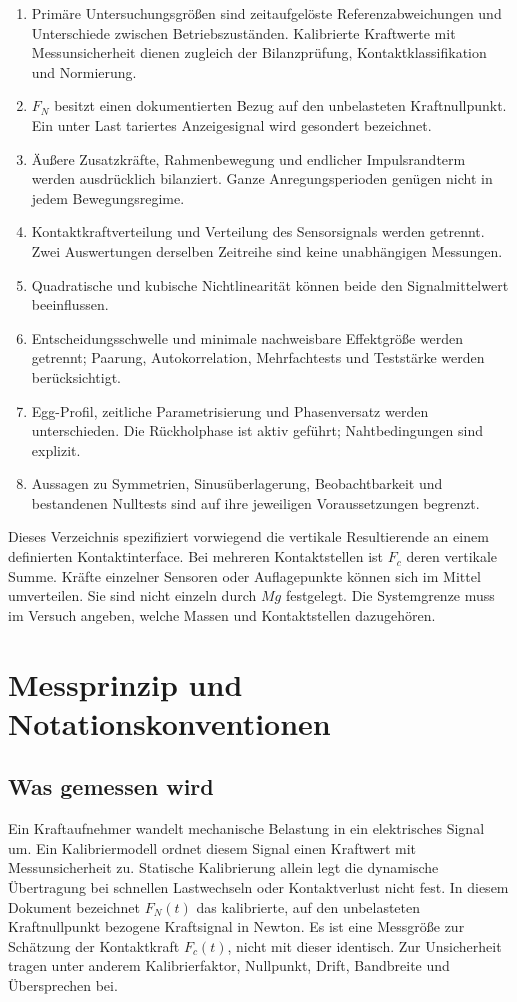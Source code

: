 \documentclass[11pt,a4paper]{article}
\begin{document}
\begin{enumerate}
\item Primäre Untersuchungsgrößen sind zeitaufgelöste Referenzabweichungen und Unterschiede zwischen Betriebszuständen. Kalibrierte Kraftwerte mit Messunsicherheit dienen zugleich der Bilanzprüfung, Kontaktklassifikation und Normierung.
\item $F_N$ besitzt einen dokumentierten Bezug auf den unbelasteten Kraftnullpunkt. Ein unter Last tariertes Anzeigesignal wird gesondert bezeichnet.
\item Äußere Zusatzkräfte, Rahmenbewegung und endlicher Impulsrandterm werden ausdrücklich bilanziert. Ganze Anregungsperioden genügen nicht in jedem Bewegungsregime.
\item Kontaktkraftverteilung und Verteilung des Sensorsignals werden getrennt. Zwei Auswertungen derselben Zeitreihe sind keine unabhängigen Messungen.
\item Quadratische und kubische Nichtlinearität können beide den Signalmittelwert beeinflussen.
\item Entscheidungsschwelle und minimale nachweisbare Effektgröße werden getrennt; Paarung, Autokorrelation, Mehrfachtests und Teststärke werden berücksichtigt.
\item Egg-Profil, zeitliche Parametrisierung und Phasenversatz werden unterschieden. Die Rückholphase ist aktiv geführt; Nahtbedingungen sind explizit.
\item Aussagen zu Symmetrien, Sinusüberlagerung, Beobachtbarkeit und bestandenen Nulltests sind auf ihre jeweiligen Voraussetzungen begrenzt.
\end{enumerate}
Dieses Verzeichnis spezifiziert vorwiegend die vertikale Resultierende an einem definierten Kontaktinterface. Bei mehreren Kontaktstellen ist $F_c$ deren vertikale Summe. Kräfte einzelner Sensoren oder Auflagepunkte können sich im Mittel umverteilen. Sie sind nicht einzeln durch $Mg$ festgelegt. Die Systemgrenze muss im Versuch angeben, welche Massen und Kontaktstellen dazugehören.

\section{Messprinzip und Notationskonventionen}\label{sec:messprinzip}
\subsection{Was gemessen wird}
Ein Kraftaufnehmer wandelt mechanische Belastung in ein elektrisches Signal um. Ein Kalibriermodell ordnet diesem Signal einen Kraftwert mit Messunsicherheit zu. Statische Kalibrierung allein legt die dynamische Übertragung bei schnellen Lastwechseln oder Kontaktverlust nicht fest.
In diesem Dokument bezeichnet $F_N(t)$ das kalibrierte, auf den unbelasteten Kraftnullpunkt bezogene Kraftsignal in Newton. Es ist eine Messgröße zur Schätzung der Kontaktkraft $F_c(t)$, nicht mit dieser identisch. Zur Unsicherheit tragen unter anderem Kalibrierfaktor, Nullpunkt, Drift, Bandbreite und Übersprechen bei.
\end{document}
